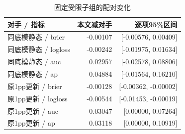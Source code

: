 \begin{table}[H]\centering\caption{固定受限子组的配对变化}
\fontsize{9bp}{12bp}\selectfont
\begin{tabularx}{\linewidth}{@{}Yrr@{}}\toprule
对手 / 指标 & 本文减对手 & 逐项95\%区间\\\midrule
同底模静态 / brier & -0.00107 & [-0.00576, 0.00409]\\
同底模静态 / logloss & -0.00242 & [-0.01975, 0.01634]\\
同底模静态 / auc & 0.02957 & [-0.02578, 0.08806]\\
同底模静态 / ap & 0.04884 & [-0.01564, 0.16210]\\
原1pp更新 / brier & -0.00128 & [-0.00362, -0.00002]\\
原1pp更新 / logloss & -0.00544 & [-0.01453, -0.00019]\\
原1pp更新 / auc & 0.03047 & [0.00000, 0.07264]\\
原1pp更新 / ap & 0.03118 & [0.00000, 0.10919]\\
\bottomrule\end{tabularx}
\end{table}